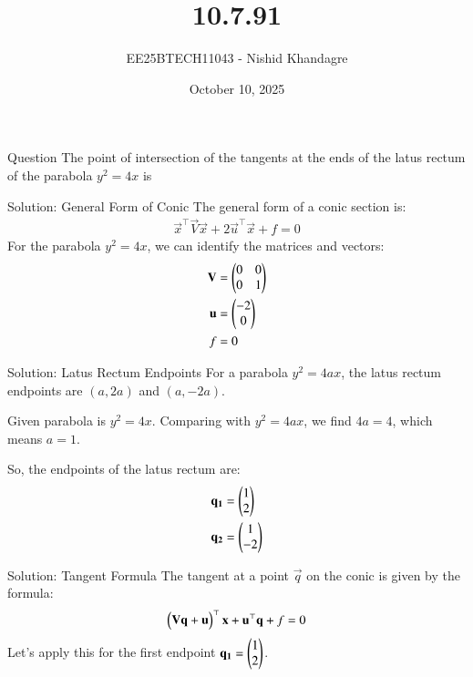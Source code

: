 \documentclass{beamer}
\title
{10.7.91}
\date{October 10, 2025}
\author
{EE25BTECH11043 - Nishid Khandagre}
\begin{document}
\frame{\titlepage}

\begin{frame}{Question}
The point of intersection of the tangents at the ends of the latus rectum of the parabola $y^2 = 4x$ is
\end{frame}

\begin{frame}{Solution: General Form of Conic}
The general form of a conic section is:
\begin{align}
\vec{x}^{\top}\vec{V}\vec{x} + 2\vec{u}^{\top}\vec{x} + f = 0
\end{align}
For the parabola $y^2 = 4x$, we can identify the matrices and vectors:
\begin{align}
\mathbf{V} &= \begin{pmatrix}0 & 0 \\ 0 & 1\end{pmatrix} \\
\mathbf{u} &= \begin{pmatrix}-2 \\ 0\end{pmatrix} \\
f &= 0
\end{align}
\end{frame}

\begin{frame}{Solution: Latus Rectum Endpoints}
For a parabola $y^2 = 4ax$, the latus rectum endpoints are $(a, 2a)$ and $(a, -2a)$.

Given parabola is $y^2 = 4x$.
Comparing with $y^2 = 4ax$, we find $4a = 4$, which means $a=1$.

So, the endpoints of the latus rectum are:
\begin{align}
\mathbf{q_1} &= \begin{pmatrix}1 \\ 2\end{pmatrix} \\
\mathbf{q_2} &= \begin{pmatrix}1 \\ -2\end{pmatrix}
\end{align}
\end{frame}

\begin{frame}{Solution: Tangent Formula}
The tangent at a point $\vec{q}$ on the conic is given by the formula:
\begin{align}
\begin{pmatrix}\mathbf{V}\mathbf{q} + \mathbf{u}\end{pmatrix}^{\top}\mathbf{x} + \mathbf{u}^{\top}\mathbf{q} + f = 0
\end{align}
Let's apply this for the first endpoint $\mathbf{q_1} = \begin{pmatrix}1 \\ 2\end{pmatrix}$.
\end{frame}
\end{document}
